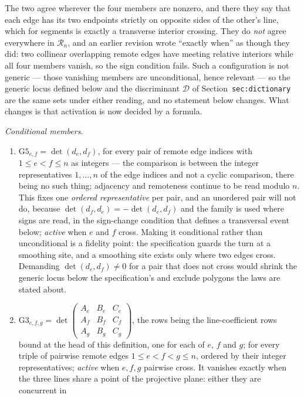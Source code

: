 \begin{definition}
The two agree wherever the four members are nonzero, and there they say that
each edge has its two endpoints strictly on opposite sides of the other's line,
which for segments is exactly a transverse interior crossing. They do
\emph{not} agree everywhere in $\mathcal R_n$, and an earlier revision wrote
``exactly when'' as though they did: two collinear overlapping remote edges have
meeting relative interiors while all four members vanish, so the sign condition
fails. Such a configuration is not generic --- those vanishing members are
unconditional, hence relevant --- so the generic locus defined below and the
discriminant $\mathcal D$ of Section~\texttt{sec:dictionary} are the same sets under
either reading, and no statement
below changes. What changes is that activation is now decided by a formula.

\emph{Conditional members.}
\begin{enumerate}
\item[(G5)] $\mathrm{G5}_{e,f}=\det(d_e,d_f)$, for every pair of remote edge
indices with $1\leq e<f\leq n$ as integers --- the comparison is between the
integer representatives $1,\dots,n$ of the edge indices and not a cyclic
comparison, there being no such thing; adjacency and remoteness continue to be
read modulo $n$. This fixes one \emph{ordered representative} per pair, and an
unordered pair will not do, because
$\det(d_f,d_e)=-\det(d_e,d_f)$ and the family is used where signs are read, in
the sign-change condition that defines a transversal event below; \emph{active} when $e$
and $f$ cross. Making it
conditional rather than unconditional is a fidelity point: the specification
guards the turn at a smoothing site, and a smoothing site exists only where two
edges cross. Demanding $\det(d_e,d_f)\neq0$ for a pair that does not cross
would shrink the generic locus below the specification's and exclude polygons
the laws are stated about.
\item[(G3)] $\mathrm{G3}_{e,f,g}=\det\begin{pmatrix}A_e&B_e&C_e\\
A_f&B_f&C_f\\ A_g&B_g&C_g\end{pmatrix}$, the rows being the line-coefficient
rows bound at the head of this definition, one for each of $e$, $f$ and $g$;
for every triple of pairwise remote edges $1\leq e<f<g\leq n$, ordered by their
integer representatives; \emph{active} when $e,f,g$ pairwise cross. It vanishes exactly when the
three lines share a point of the projective plane: either they are concurrent in

\end{enumerate}
\end{definition}
